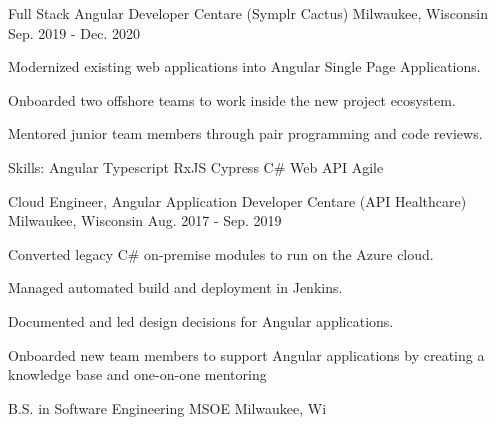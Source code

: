 \begin{cventries}
  \cventry
    {Full Stack Angular Developer} %
    {Centare (Symplr Cactus)} %
    {Milwaukee, Wisconsin} %
    {Sep. 2019 - Dec. 2020} %
    {
      \begin{cvitems} %
        \item {Modernized existing web applications into Angular Single Page Applications.}
        \item {Onboarded two offshore teams to work inside the new project ecosystem.}
        \item {Mentored junior team members through pair programming and code reviews.}
        \item {Skills: Angular \textbullet{} Typescript \textbullet{} RxJS \textbullet{} Cypress \textbullet{} C\# Web API \textbullet{} Agile}
      \end{cvitems}
    }

  \cventry
    {Cloud Engineer, Angular Application Developer} %
    {Centare (API Healthcare)} %
    {Milwaukee, Wisconsin} %
    {Aug. 2017 - Sep. 2019} %
    {
      \begin{cvitems} %
        \item {Converted legacy C\# on-premise modules to run on the Azure cloud.}
        \item {Managed automated build and deployment in Jenkins.}
        \item {Documented and led design decisions for Angular applications.}
        \item {Onboarded new team members to support Angular applications by creating a knowledge base and one-on-one mentoring}
      \end{cvitems}
    }

  \cventry
    {B.S. in Software Engineering} %
    {MSOE} %
    {Milwaukee, Wi} %
    { } %
    {
    }

\end{cventries}
